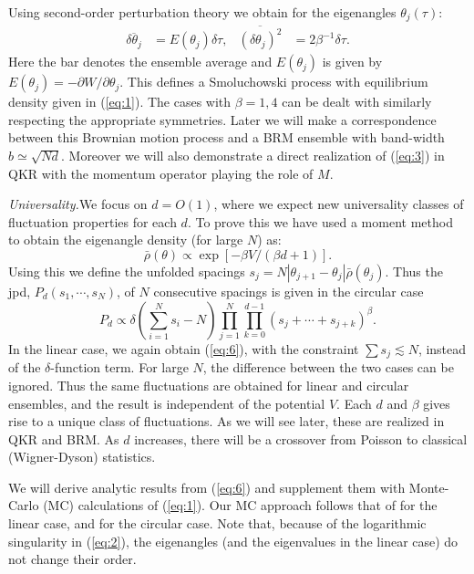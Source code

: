 \documentclass[reprint,amsmath,amssymb,showpacs,aps,]{revtex4-1}
\begin{document}
{Using second-order perturbation theory \cite{FDY,SP1} we obtain for the eigenangles $\theta_{j}(\tau)$:
\begin{align}\label{eq:4}
\overline{\delta\theta_{j}} & = E(\theta_{j})\delta\tau, & \overline{(\delta \theta_{j})^{2}} & = 2\beta^{-1}\delta\tau.
\end{align}
Here the bar denotes the ensemble average and $E(\theta_{j})$ is given by $E(\theta_{j})=-\partial W/ \partial \theta_{j}$. This defines a Smoluchowski process with equilibrium density given in (\ref{eq:1}). The cases with $\beta=1,4$ can be dealt with similarly respecting the appropriate symmetries. Later we will make a correspondence between this Brownian motion process and a BRM ensemble with band-width $b\simeq\sqrt{Nd}$. Moreover we will also demonstrate a direct realization of (\ref{eq:3}) in QKR with the momentum operator playing the role of $M$. \par
\textit{Universality.}\textemdash We focus on $d = O(1)$, where we expect new universality classes of fluctuation properties for each $d$. To prove this we have used a moment method to obtain the eigenangle density (for large $N$) as:
\begin{equation}\label{eq:5}
\bar{\rho}{(\theta)}  \propto  \exp \left[-\beta V/(\beta d+1)\right].
\end{equation}
Using this we define the unfolded spacings $s_{j}= N|\theta_{j+1}-\theta_{j}| \bar{\rho}(\theta_{j})$. Thus the jpd, $ P_{d}(s_{1},\cdots,s_{N})$, of $N$ consecutive spacings is given in the circular case
\begin{equation}\label{eq:6}
P_{d} \propto \delta(\sum_{i=1}^{N}s_{i}-N) \prod_{j=1}^{N}\prod_{k=0}^{d-1}(s_{j}+\cdots+s_{j+k})^{\beta}.
\end{equation}
In the linear case, we again obtain (\ref{eq:6}), with the constraint $\sum s_{j}\lesssim N$, instead of the $\delta$-function term. For large $N$, the difference between the two cases can be ignored. Thus the same fluctuations are obtained for linear and circular ensembles, and the result is independent of the potential $V$. Each $d$ and $\beta$ gives rise to a unique class of fluctuations. As we will see later, these are realized in QKR and BRM. As $d$ increases, there will be a crossover from Poisson to classical (Wigner-Dyson) statistics. \par
We will derive analytic results from (\ref{eq:6}) and supplement them with Monte-Carlo (MC) calculations of (\ref{eq:1}). Our MC approach follows that of \cite{GPPS} for the linear case, and \cite{KP2} for the circular case. Note that, because of the logarithmic singularity in (\ref{eq:2}), the eigenangles (and the eigenvalues in the linear case) do not change their order.\par
}
\end{document}

